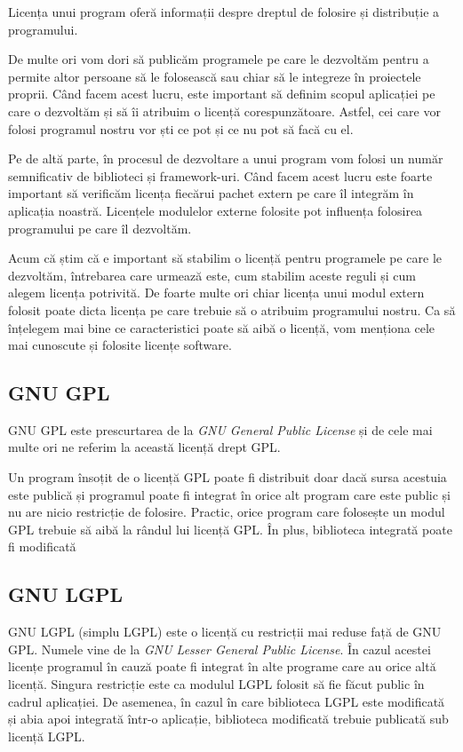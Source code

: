 Licența unui program oferă informații despre dreptul de folosire și distribuție
a programului.

De multe ori vom dori să publicăm programele pe care le dezvoltăm pentru a
permite altor persoane să le folosească sau chiar să le integreze în proiectele
proprii. Când facem acest lucru, este important să definim scopul aplicației pe
care o dezvoltăm și să îi atribuim o licență corespunzătoare. Astfel, cei care
vor folosi programul nostru vor ști ce pot și ce nu pot să facă cu el.

Pe de altă parte, în procesul de dezvoltare a unui program vom folosi un număr
semnificativ de biblioteci și framework-uri. Când facem acest lucru este foarte
important să verificăm licența fiecărui pachet extern pe care îl integrăm în
aplicația noastră. Licențele modulelor externe folosite pot influența folosirea
programului pe care îl dezvoltăm.

Acum că știm că e important să stabilim o licență pentru programele pe care le
dezvoltăm, întrebarea care urmează este, cum stabilim aceste reguli și cum
alegem licența potrivită. De foarte multe ori chiar licența unui modul extern
folosit poate dicta licența pe care trebuie să o atribuim programului nostru. Ca
să înțelegem mai bine ce caracteristici poate să aibă o licență, vom menționa
cele mai cunoscute și folosite licențe software.

\subsection{GNU GPL}
\label{sec:appdev-licensing-gpl}

GNU GPL  este prescurtarea de la \textit{GNU General Public License} și de cele mai multe
ori ne referim la această licență drept GPL.

Un program însoțit de o licență GPL poate fi distribuit doar dacă sursa acestuia
este publică și programul poate fi integrat în orice alt program care este
public și nu are nicio restricție de folosire. Practic, orice program care
folosește un modul GPL trebuie să aibă la rândul lui licență GPL. În plus,
biblioteca integrată poate fi modificată

\subsection{GNU LGPL}
\label{sec:appdev-licensing-lgpl}

GNU LGPL  (simplu LGPL) este
o licență cu restricții mai reduse față de GNU GPL. Numele vine de la \textit{GNU
Lesser General Public License}. În cazul acestei licențe programul în cauză poate
fi integrat în alte programe care au orice altă licență. Singura restricție este
ca modulul LGPL folosit să fie făcut public în cadrul aplicației. De asemenea,
în cazul în care biblioteca LGPL este modificată și abia apoi integrată într-o
aplicație, biblioteca modificată trebuie publicată sub licență LGPL.

